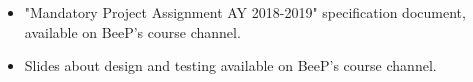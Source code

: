 
%

\begin{itemize}
\item "Mandatory Project Assignment AY 2018-2019" specification document, available on BeeP's course channel.
\item Slides about design and testing available on BeeP's course channel.
\end{itemize}

%